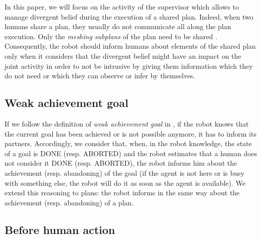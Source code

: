 \documentclass[english,a4paper,11pt,twoside]{StyleThese}
\begin{document}
In this paper, we will focus on the activity of the supervisor which allows to manage divergent belief during the execution of a shared plan. Indeed, when two humans share a plan, they usually do not communicate all along the plan execution. Only the \textit{meshing subplans} of the plan need to be shared \cite{bratman1993shared}. Consequently, the robot should inform humans about elements of the shared plan only when it considers that the divergent belief might have an impact on the joint activity in order to not be intrusive by giving them information which they do not need or which they can observe or infer by themselves.


\subsection{Weak achievement goal}

If we follow the definition of \textit{weak achievement goal} in \cite{cohen1991teamwork}, if the robot knows that the current goal has been achieved or is not possible anymore, it has to inform its partners. Accordingly, we consider that, when, in the robot knowledge, the state of a goal is DONE (resp. ABORTED) and the robot estimates that a human does not consider it DONE (resp. ABORTED), the robot informs him about the achievement (resp. abandoning) of the goal (if the agent is not here or is busy with something else, the robot will do it as soon as the agent is available). We extend this reasoning to plans: the robot informs in the same way about the achievement (resp. abandoning) of a plan. 


\subsection{Before human action}
\end{document}
